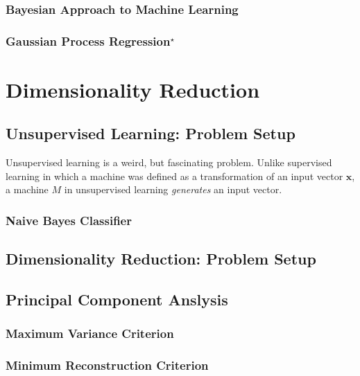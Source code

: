 \documentclass{report}
\newcommand{\vect}[1]{\mathbf{#1}}
\newcommand{\vx}[0]{\vect{x}}
\newcommand{\todo}[1]{{\Large\textcolor{red}{#1}}}
\begin{document}
\subsection{Bayesian Approach to Machine Learning}


\subsection{Gaussian Process Regression$^\star$}


\chapter{Dimensionality Reduction}
\label{chap:dimred}

\section{Unsupervised Learning: Problem Setup}

Unsupervised learning is a weird, but fascinating problem. Unlike supervised
learning in which a machine was defined as a transformation of an input vector
$\vx$, a machine $M$ in unsupervised learning {\it generates} an input vector.

\subsection{Naive Bayes Classifier}

\todo{}

\section{Dimensionality Reduction: Problem Setup}
\label{sec:dimred}

\section{Principal Component Anslysis}

\subsection{Maximum Variance Criterion}

\subsection{Minimum Reconstruction Criterion}

\end{document}
